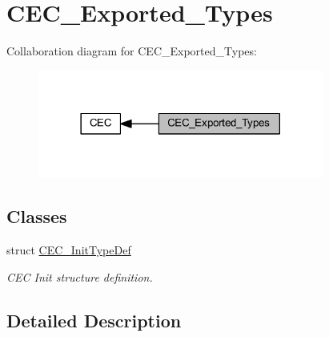 \hypertarget{group___c_e_c___exported___types}{}\section{C\+E\+C\+\_\+\+Exported\+\_\+\+Types}
\label{group___c_e_c___exported___types}
Collaboration diagram for C\+E\+C\+\_\+\+Exported\+\_\+\+Types\+:
\nopagebreak
\begin{figure}[H]
\begin{center}
\leavevmode
\includegraphics[width=266pt]{group___c_e_c___exported___types}
\end{center}
\end{figure}
\subsection*{Classes}
\begin{DoxyCompactItemize}
\item 
struct \hyperlink{struct_c_e_c___init_type_def}{C\+E\+C\+\_\+\+Init\+Type\+Def}
\begin{DoxyCompactList}\small\item\em C\+EC Init structure definition. \end{DoxyCompactList}\end{DoxyCompactItemize}


\subsection{Detailed Description}
